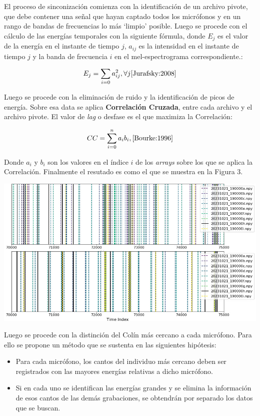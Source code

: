\documentclass[a0,portrait]{a0poster}
\begin{document}
\begin{multicols}{3}
El proceso de sinconización comienza con la identificación de un archivo pivote,
que debe contener una señal que hayan captado todos los micrófonos y en un rango de bandas de frecuencias
lo más `limpio' posible. Luego se procede con el cálculo de las energías temporales con la siguiente fórmula, donde $E_j$ es el valor de la energía en el instante de tiempo $j$, $a_{ij}$ es la intensidad en el instante de tiempo $j$ y la banda de frecuencia $i$ en el mel-espectrograma correspondiente.:

\begin{equation*}
	E_j = \sum_{i=0} a_{ij}^{2}, \forall j     \cite{Jurafsky:2008}
\end{equation*} 

Luego se procede con la eliminación de ruido y la identificación de picos de energía. Sobre esa data se aplica \textbf{Correlación Cruzada}, entre cada archivo y el archivo pivote. El valor de \textit{lag} o desfase es el que maximiza la Correlación:

\begin{equation*}
	CC = \sum_{i=0}^{n} a_{i}b_{i},     \cite{Bourke:1996}
\end{equation*} 

Donde $a_i$ y $b_i$ son los valores en el índice $i$ de los \textit{arrays} sobre los que se aplica la Correlación. Finalmente el resutado es como el que se muestra en la Figura 3.

\begin{center}\vspace{0.1cm}
    \includegraphics[width=0.8\linewidth]{assets/peaks_alignment.jpg}
\end{center}\vspace{0.1cm}

Luego se procede con la distinción del Colín más cercano a cada micrófono. Para ello se propone un método que se sustenta en las siguientes hipótesis:
\begin{itemize}
    \item Para cada micrófono, los cantos del individuo más cercano deben ser registrados con las mayores energías relativas a dicho micrófono.
    \item Si en cada uno se identifican las energías grandes y se elimina la información de esos cantos de las demás grabaciones, se obtendrán por separado los datos que se buscan.
\end{itemize}


\end{multicols}
\end{document}
